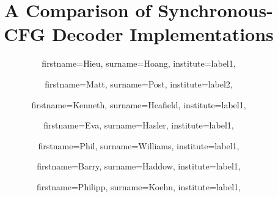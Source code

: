\documentclass{pbml}
\begin{document}

\title{A Comparison of Synchronous-CFG \titlelinebreak{} Decoder Implementations}




\author{
  firstname=Hieu,
  surname=Hoang,
  institute=label1,
}
\author{
  firstname=Matt,
  surname=Post,
  institute=label2,
}
\author{
  firstname=Kenneth,
  surname=Heafield,
  institute=label1,
}
\author{
  firstname=Eva,
  surname=Hasler,
  institute=label1,
}
\author{
  firstname=Phil,
  surname=Williams,
  institute=label1,
}
\author{
  firstname=Barry,
  surname=Haddow,
  institute=label1,
}
\author{
  firstname=Philipp,
  surname=Koehn,
  institute=label1,
}

\end{document}
